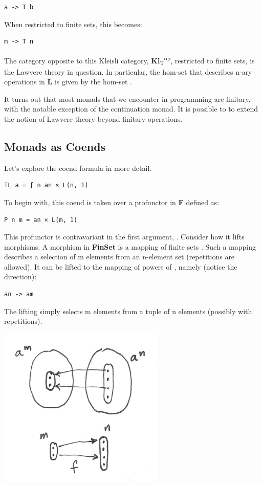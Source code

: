\begin{verbatim}
a -> T b
\end{verbatim}

When restricted to finite sets, this becomes:

\begin{verbatim}
m -> T n
\end{verbatim}

The category opposite to this Kleisli category,
\textbf{Kl}\textsubscript{T}\textsuperscript{op}, restricted to finite
sets, is the Lawvere theory in question. In particular, the hom-set
 that describes n-ary operations in \textbf{L} is given
by the hom-set .

It turns out that most monads that we encounter in programming are
finitary, with the notable exception of the continuation monad. It is
possible to to extend the notion of Lawvere theory beyond finitary
operations.

\subsection{Monads as Coends}\label{monads-as-coends}

Let's explore the coend formula in more detail.

\begin{verbatim}
TL a = ∫ n an × L(n, 1)
\end{verbatim}

To begin with, this coend is taken over a profunctor  in
\textbf{F} defined as:

\begin{verbatim}
P n m = an × L(m, 1)
\end{verbatim}

This profunctor is contravariant in the first argument, .
Consider how it lifts morphisms. A morphism in \textbf{FinSet} is a
mapping of finite sets . Such a
mapping describes a selection of m elements from an n-element set
(repetitions are allowed). It can be lifted to the mapping of powers of
, namely (notice the direction):

\begin{verbatim}
an -> am
\end{verbatim}

The lifting simply selects m elements from a tuple of n elements
 (possibly with repetitions).

\includegraphics[width=3.12500in]{images/liftpower.png}

